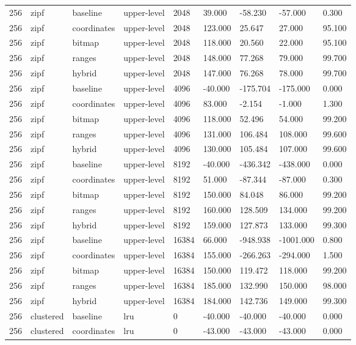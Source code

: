 \begin{tabular}{lllllllll}
256 & zipf & baseline & upper-level & 2048 & 39.000 & -58.230 & -57.000 & 0.300 \\
256 & zipf & coordinates & upper-level & 2048 & 123.000 & 25.647 & 27.000 & 95.100 \\
256 & zipf & bitmap & upper-level & 2048 & 118.000 & 20.560 & 22.000 & 95.100 \\
256 & zipf & ranges & upper-level & 2048 & 148.000 & 77.268 & 79.000 & 99.700 \\
256 & zipf & hybrid & upper-level & 2048 & 147.000 & 76.268 & 78.000 & 99.700 \\
256 & zipf & baseline & upper-level & 4096 & -40.000 & -175.704 & -175.000 & 0.000 \\
256 & zipf & coordinates & upper-level & 4096 & 83.000 & -2.154 & -1.000 & 1.300 \\
256 & zipf & bitmap & upper-level & 4096 & 118.000 & 52.496 & 54.000 & 99.200 \\
256 & zipf & ranges & upper-level & 4096 & 131.000 & 106.484 & 108.000 & 99.600 \\
256 & zipf & hybrid & upper-level & 4096 & 130.000 & 105.484 & 107.000 & 99.600 \\
256 & zipf & baseline & upper-level & 8192 & -40.000 & -436.342 & -438.000 & 0.000 \\
256 & zipf & coordinates & upper-level & 8192 & 51.000 & -87.344 & -87.000 & 0.300 \\
256 & zipf & bitmap & upper-level & 8192 & 150.000 & 84.048 & 86.000 & 99.200 \\
256 & zipf & ranges & upper-level & 8192 & 160.000 & 128.509 & 134.000 & 99.200 \\
256 & zipf & hybrid & upper-level & 8192 & 159.000 & 127.873 & 133.000 & 99.300 \\
256 & zipf & baseline & upper-level & 16384 & 66.000 & -948.938 & -1001.000 & 0.800 \\
256 & zipf & coordinates & upper-level & 16384 & 155.000 & -266.263 & -294.000 & 1.500 \\
256 & zipf & bitmap & upper-level & 16384 & 150.000 & 119.472 & 118.000 & 99.200 \\
256 & zipf & ranges & upper-level & 16384 & 185.000 & 132.990 & 150.000 & 98.000 \\
256 & zipf & hybrid & upper-level & 16384 & 184.000 & 142.736 & 149.000 & 99.300 \\
256 & clustered & baseline & lru & 0 & -40.000 & -40.000 & -40.000 & 0.000 \\
256 & clustered & coordinates & lru & 0 & -43.000 & -43.000 & -43.000 & 0.000 \\

\end{tabular}
